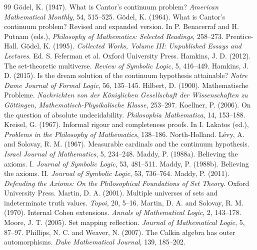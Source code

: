 \documentclass{situationist-preprint}
\begin{document}
\begin{thebibliography}{99}
 G\"odel, K. (1947). What is Cantor's continuum problem? \emph{American Mathematical Monthly}, 54, 515--525.
 G\"odel, K. (1964). What is Cantor's continuum problem? Revised and expanded version. In P. Benacerraf and H. Putnam (eds.), \emph{Philosophy of Mathematics: Selected Readings}, 258--273. Prentice-Hall.
 G\"odel, K. (1995). \emph{Collected Works, Volume III: Unpublished Essays and Lectures}. Ed. S. Feferman et al. Oxford University Press.
 Hamkins, J. D. (2012). The set-theoretic multiverse. \emph{Review of Symbolic Logic}, 5, 416--449.
 Hamkins, J. D. (2015). Is the dream solution of the continuum hypothesis attainable? \emph{Notre Dame Journal of Formal Logic}, 56, 135--145.
 Hilbert, D. (1900). Mathematische Probleme. \emph{Nachrichten von der Königlichen Gesellschaft der Wissenschaften zu Göttingen, Mathematisch-Physikalische Klasse}, 253--297.
 Koellner, P. (2006). On the question of absolute undecidability. \emph{Philosophia Mathematica}, 14, 153--188.
 Kreisel, G. (1967). Informal rigour and completeness proofs. In I. Lakatos (ed.), \emph{Problems in the Philosophy of Mathematics}, 138--186. North-Holland.
 Lévy, A. and Solovay, R. M. (1967). Measurable cardinals and the continuum hypothesis. \emph{Israel Journal of Mathematics}, 5, 234--248.
 Maddy, P. (1988a). Believing the axioms. I. \emph{Journal of Symbolic Logic}, 53, 481--511.
 Maddy, P. (1988b). Believing the axioms. II. \emph{Journal of Symbolic Logic}, 53, 736--764.
 Maddy, P. (2011). \emph{Defending the Axioms: On the Philosophical Foundations of Set Theory}. Oxford University Press.
 Martin, D. A. (2001). Multiple universes of sets and indeterminate truth values. \emph{Topoi}, 20, 5--16.
 Martin, D. A. and Solovay, R. M. (1970). Internal Cohen extensions. \emph{Annals of Mathematical Logic}, 2, 143--178.
 Moore, J. T. (2005). Set mapping reflection. \emph{Journal of Mathematical Logic}, 5, 87--97.
 Phillips, N. C. and Weaver, N. (2007). The Calkin algebra has outer automorphisms. \emph{Duke Mathematical Journal}, 139, 185--202.

\end{thebibliography}
\end{document}
